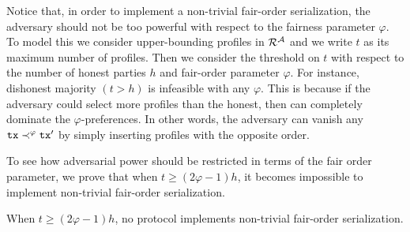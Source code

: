 Notice that, in order to implement a non-trivial fair-order serialization, the adversary should not be too powerful with respect to the fairness parameter $\varphi$.
%
To model this we consider upper-bounding profiles in $\mathcal{R}^\mathcal{A}$ and we write $t$ as its maximum number of profiles.
%
Then we consider the threshold on $t$ with respect to the number of honest parties $h$ and fair-order parameter $\varphi$.
%
For instance, dishonest majority $(t > h)$ is infeasible with any $\varphi$.
%
This is because if the adversary could select more profiles than the honest, then \adv can completely dominate the $\varphi$-preferences.
%
In other words, the adversary can vanish any $\mathtt{tx} \prec^\varphi \mathtt{tx}'$ by simply inserting profiles with the opposite order.

To see how adversarial power should be restricted in terms of the fair order parameter, we prove that when $t \ge (2\varphi - 1)h$, it becomes impossible to implement non-trivial fair-order serialization.

\begin{theorem} \label{thm:admissible-adversary}
    When $t \ge (2\varphi - 1)h$, no protocol implements non-trivial fair-order serialization.
\end{theorem}

